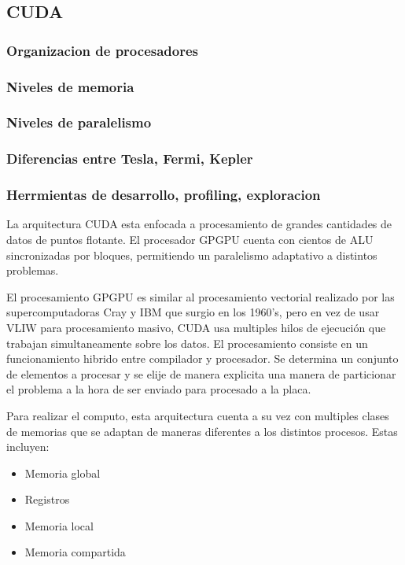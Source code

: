 \subsection{CUDA}

\subsubsection{Organizacion de procesadores}
\subsubsection{Niveles de memoria}
\subsubsection{Niveles de paralelismo}
\subsubsection{Diferencias entre Tesla, Fermi, Kepler}
\subsubsection{Herrmientas de desarrollo, profiling, exploracion}

La arquitectura CUDA esta enfocada a procesamiento de grandes cantidades de datos
de puntos flotante. El procesador GPGPU cuenta con cientos de ALU sincronizadas
por bloques, permitiendo un paralelismo adaptativo a distintos problemas.

El procesamiento GPGPU es similar al procesamiento vectorial
realizado por las supercomputadoras Cray y IBM que surgio en los 1960's, pero
en vez de usar VLIW para procesamiento masivo, CUDA usa multiples hilos de ejecuci\'on
que trabajan simultaneamente sobre los datos.
El procesamiento consiste en un funcionamiento hibrido entre compilador y procesador. Se determina
un conjunto de elementos a procesar y se elije de manera explicita una manera de particionar el
problema a la hora de ser enviado para procesado a la placa.


Para realizar el computo, esta arquitectura cuenta a su vez con multiples clases de memorias
que se adaptan de maneras diferentes a los distintos procesos. Estas incluyen:

\begin{itemize}
  \item Memoria global
  \item Registros
  \item Memoria local
  \item Memoria compartida
\end{itemize}

